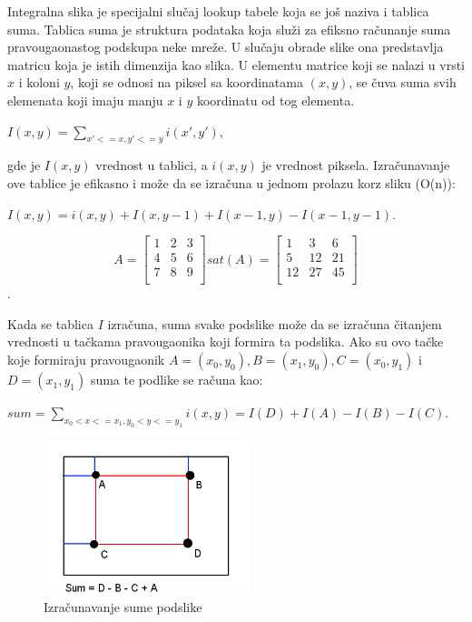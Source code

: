 \documentclass[a4paper,12pt,titlepage]{article}
\begin{document}
Integralna slika je specijalni slučaj lookup tabele koja se još naziva i tablica suma. Tablica suma je struktura podataka koja služi za efiksno računanje suma pravougaonastog podskupa neke mreže. U slučaju obrade slike ona predstavlja matricu koja je istih dimenzija kao slika. U elementu matrice koji se nalazi u vrsti $x$ i koloni $y$, koji se odnosi na piksel sa koordinatama $(x, y)$, se čuva suma svih elemenata koji imaju manju $x$ i $y$ koordinatu od tog elementa. 

\begin{center}
$I(x, y) = \sum_{x' <= x, y' <= y} i(x', y')$,
\end{center}

gde je $I(x, y)$ vrednost u tablici, a $i(x, y)$ je vrednost piksela. Izračunavanje ove tablice je efikasno i može da se izračuna u jednom prolazu korz sliku (O(n)):

\begin{center}
$I(x, y) = i(x, y) + I(x, y - 1) + I(x - 1, y) - I(x - 1, y - 1)$.
\end{center}

 \[
 A
 =
\begin{bmatrix}
     1 & 2 & 3 \\
     4 & 5 & 6 \\
     7 & 8 & 9 \\
\end{bmatrix}
sat(A)
=
\begin{bmatrix}
     1 & 3 & 6 \\
     5 & 12 & 21 \\
     12 & 27 & 45 \\
\end{bmatrix}
\].

Kada se tablica $I$  izračuna, suma svake podslike može da se izračuna čitanjem vrednosti u tačkama pravougaonika koji formira ta podslika. Ako su ovo tačke koje formiraju pravougaonik $A = (x_0, y_0), B = (x_1, y_0), C = (x_0, y_1)$ i $D = (x_1, y_1)$ suma te podlike se računa kao:

\begin{center}
$sum = \sum_{x_0 < x <= x_1, y_0 < y <= y_1} i(x, y) = I(D) + I(A) - I(B) - I(C)$.
\end{center} 

\begin{figure}[ht!]
\centering
\includegraphics[width=60mm]{img/sat.png}
\caption{Izračunavanje sume podslike}
\label{overflow}
\end{figure}
\end{document}
